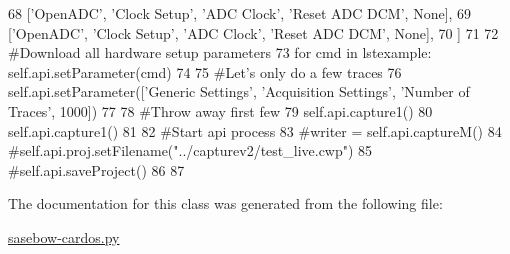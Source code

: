 \begin{DoxyCode}
68                       [\textcolor{stringliteral}{'OpenADC'}, \textcolor{stringliteral}{'Clock Setup'}, \textcolor{stringliteral}{'ADC Clock'}, \textcolor{stringliteral}{'Reset ADC DCM'}, \textcolor{keywordtype}{None}],
69                       [\textcolor{stringliteral}{'OpenADC'}, \textcolor{stringliteral}{'Clock Setup'}, \textcolor{stringliteral}{'ADC Clock'}, \textcolor{stringliteral}{'Reset ADC DCM'}, \textcolor{keywordtype}{None}],
70                       ]
71         
72         \textcolor{comment}{#Download all hardware setup parameters}
73         \textcolor{keywordflow}{for} cmd \textcolor{keywordflow}{in} lstexample: self.api.setParameter(cmd)
74         
75         \textcolor{comment}{#Let's only do a few traces}
76         self.api.setParameter([\textcolor{stringliteral}{'Generic Settings'}, \textcolor{stringliteral}{'Acquisition Settings'}, \textcolor{stringliteral}{'Number of Traces'}, 1000])
77                       
78         \textcolor{comment}{#Throw away first few}
79         self.api.capture1()
80         self.api.capture1()
81 
82         \textcolor{comment}{#Start api process}
83         \textcolor{comment}{#writer = self.api.captureM()}
84         \textcolor{comment}{#self.api.proj.setFilename("../capturev2/test\_live.cwp")}
85         \textcolor{comment}{#self.api.saveProject()}
86 
87 
\end{DoxyCode}


The documentation for this class was generated from the following file\+:\begin{DoxyCompactItemize}
\item 
\hyperlink{sasebow-cardos_8py}{sasebow-\/cardos.\+py}\end{DoxyCompactItemize}
